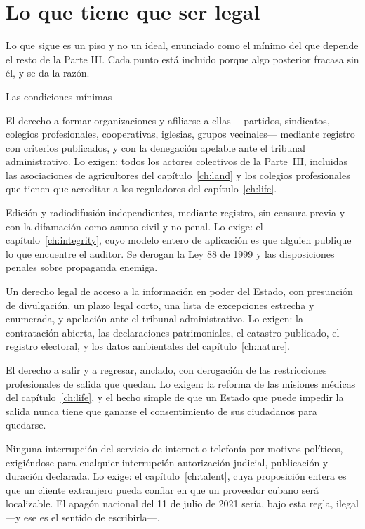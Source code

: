 \section{Lo que tiene que ser legal}

Lo que sigue es un piso y no un ideal, enunciado como el mínimo del que depende el
resto de la Parte III. Cada punto está incluido porque algo posterior fracasa sin
él, y se da la razón.

\begin{design}{Las condiciones mínimas}
\label{d:minimum}
\begin{rules}
 El derecho a formar organizaciones y afiliarse a ellas
---partidos, sindicatos, colegios profesionales, cooperativas, iglesias, grupos
vecinales--- mediante registro con criterios publicados, y con la denegación
apelable ante el tribunal administrativo. Lo exigen: todos los actores colectivos de
la Parte~III, incluidas las asociaciones de agricultores del
capítulo~\ref{ch:land} y los colegios profesionales que tienen que acreditar a los
reguladores del capítulo~\ref{ch:life}.

 Edición y radiodifusión independientes, mediante registro, sin censura
previa y con la difamación como asunto civil y no penal. Lo exige: el
capítulo~\ref{ch:integrity}, cuyo modelo entero de aplicación es que alguien publique
lo que encuentre el auditor. Se derogan la Ley 88 de 1999 y las disposiciones penales
sobre propaganda enemiga.

 Un derecho legal de acceso a la información en poder del Estado,
con presunción de divulgación, un plazo legal corto, una lista de excepciones
estrecha y enumerada, y apelación ante el tribunal administrativo. Lo exigen: la
contratación abierta, las declaraciones patrimoniales, el catastro publicado, el
registro electoral, y los datos ambientales del capítulo~\ref{ch:nature}.

 El derecho a salir y a regresar, anclado, con derogación de las
restricciones profesionales de salida que quedan. Lo exigen: la reforma de las
misiones médicas del capítulo~\ref{ch:life}, y el hecho simple de que un Estado que
puede impedir la salida nunca tiene que ganarse el consentimiento de sus ciudadanos
para quedarse.

 Ninguna interrupción del servicio de internet o telefonía por
motivos políticos, exigiéndose para cualquier interrupción autorización judicial,
publicación y duración declarada. Lo exige: el capítulo~\ref{ch:talent}, cuya
proposición entera es que un cliente extranjero pueda confiar en que un proveedor
cubano será localizable. El apagón nacional del 11 de julio de 2021 sería, bajo esta
regla, ilegal ---y ese es el sentido de escribirla---.
\end{rules}
\end{design}

